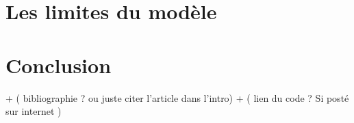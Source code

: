 \documentclass[a4paper,fleqn]{article}
\begin{document}
\section{Les limites du modèle}


\section{Conclusion} 

+ ( bibliographie ? ou juste citer l'article dans l'intro)
+ ( lien du code ? Si posté sur internet )
 







\end{document}
